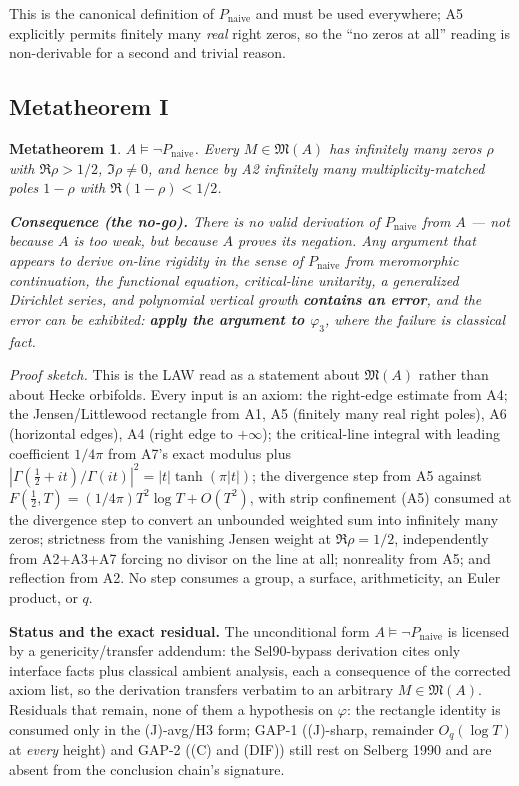 \documentclass[11pt]{amsart}
\newtheorem{metatheorem}[theorem]{Metatheorem}
\theoremstyle{remark}
\begin{document}
This is the canonical definition of $P_{\mathrm{naive}}$ and must be used
everywhere; A5 explicitly permits finitely many \emph{real} right zeros,
so the ``no zeros at all'' reading is non-derivable for a second and
trivial reason.

\subsection{Metatheorem I}

\begin{metatheorem}
\label{met:I}
$A \models \neg P_{\mathrm{naive}}$. Every $M\in\mathfrak M(A)$ has
infinitely many zeros $\rho$ with $\Re\rho>1/2$, $\Im\rho\neq0$, and
hence by A2 infinitely many multiplicity-matched poles $1-\rho$ with
$\Re(1-\rho)<1/2$.

\textbf{Consequence (the no-go).} There is no valid derivation of
$P_{\mathrm{naive}}$ from $A$ --- not because $A$ is too weak, but
because $A$ proves its negation. Any argument that appears to derive
on-line rigidity in the sense of $P_{\mathrm{naive}}$ from meromorphic
continuation, the functional equation, critical-line unitarity, a
generalized Dirichlet series, and polynomial vertical growth
\textbf{contains an error}, and the error can be exhibited: \textbf{apply
the argument to $\varphi_3$}, where the failure is classical fact.
\end{metatheorem}

\emph{Proof sketch.} This is the LAW read as a statement about
$\mathfrak M(A)$ rather than about Hecke orbifolds. Every input is an
axiom: the right-edge estimate from A4; the Jensen/Littlewood rectangle
from A1, A5 (finitely many real right poles), A6 (horizontal edges), A4
(right edge to $+\infty$); the critical-line integral with leading
coefficient $1/4\pi$ from A7's exact modulus plus
$|\Gamma(\tfrac12+it)/\Gamma(it)|^2=|t|\tanh(\pi|t|)$; the divergence
step from A5 against $F(\tfrac12,T)=(1/4\pi)T^2\log T+O(T^2)$, with
strip confinement (A5) consumed at the divergence step to convert an
unbounded weighted sum into infinitely many zeros; strictness from the
vanishing Jensen weight at $\Re\rho=1/2$, independently from A2+A3+A7
forcing no divisor on the line at all; nonreality from A5; and reflection
from A2. No step consumes a group, a surface, arithmeticity, an Euler
product, or $q$.

\textbf{Status and the exact residual.} The unconditional form
$A\models\neg P_{\mathrm{naive}}$ is licensed by a genericity/transfer
addendum: the Sel90-bypass derivation cites only interface facts plus
classical ambient analysis, each a consequence of the corrected axiom
list, so the derivation transfers verbatim to an arbitrary
$M\in\mathfrak M(A)$. Residuals that remain, none of them a hypothesis on
$\varphi$: the rectangle identity is consumed only in the (J)-avg/H3
form; GAP-1 ((J)-sharp, remainder $O_q(\log T)$ at \emph{every} height)
and GAP-2 ((C) and (DIF)) still rest on Selberg 1990 and are absent from
the conclusion chain's signature.
\end{document}
